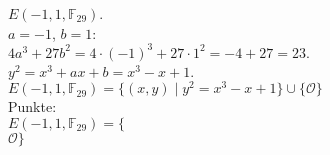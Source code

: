 \documentclass[a4paper, 10pt]{scrartcl}
\begin{document}
$E(-1, 1, \mathbb{F}_{29})$.\\

$a = -1$, $b = 1$:\\
$4a^{3} + 27b^{2} = 4\cdot (-1)^{3} + 27\cdot 1^{2} = -4 + 27 = 23.$\\
$y^{2} = x^{3} + ax + b = x^{3} - x + 1$.\\

$E(-1, 1, \mathbb{F}_{29}) = \{ (x, y)\mid y^{2} = x^{3} - x + 1\}\cup \{ \mathcal{O} \}$\\

Punkte:\\
$
E(-1, 1, \mathbb{F}_{29}) = \{
$\\
$
$\\
$
$\\
$
$\\
$
$\\
$
\mathcal{O} \}
$\\
\end{document}

